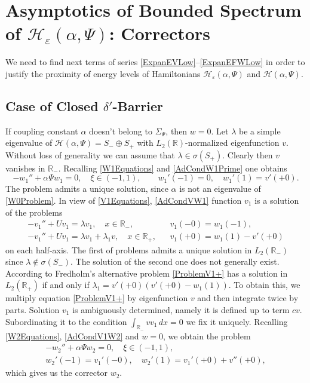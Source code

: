 \documentclass[11pt,english]{amsart}%
\begin{document}
\section{Asymptotics of Bounded Spectrum of  $\mathcal{H_{\varepsilon}}(\alpha,\Psi)$: Correctors}\label{SectionCorrector}
We need to find  next terms of  series \eqref{ExpanEVLow}--\eqref{ExpanEFWLow} in order to justify
the proximity of  energy levels of Hamiltonians $\mathcal{H_{\varepsilon}}(\alpha,\Psi)$ and $\mathcal{H}(\alpha,\Psi)$.



\subsection{Case of Closed $\delta'$-Barrier}
If coupling constant $\alpha$ doesn't belong to $\Sigma_\Psi$, then $w=0$.
Let $\lambda $ be a simple eigenvalue of  $\mathcal{H}(\alpha,\Psi)=S_-\oplus S_+$ with  $L_2(\mathbb{R})$-normalized eigenfunction $v$. Without loss of generality
we can assume that $\lambda\in \sigma(S_+)$. Clearly then $v$ vanishes in $\mathbb{R}_-$. Recalling \eqref{W1Equations} and \eqref{AdCondW1Prime} one obtains
\begin{equation*}
-w_1''+\alpha\Psi w_1=0,\quad\xi\in(-1,1),\qquad
w_1'(-1)=0,\quad w_1'(1)=v'(+0).
\end{equation*}
The problem admits a unique solution, since $\alpha$ is not an eigenvalue of \eqref{W0Problem}.
In view of \eqref{V1Equations}, \eqref{AdCondVW1}  function $v_1$
is a solution of the problems
\begin{align}\label{ProblemV1-}
  &-v_1''+U v_1=\lambda v_1, \quad x\in \mathbb{R}_-,&&v_1(-0)=w_1(-1),\\\label{ProblemV1+}
  &-v_1''+U v_1=\lambda v_1+\lambda_1 v, \quad x\in \mathbb{R}_+, &&v_1(+0)=w_1(1)-v '(+0)&
\end{align}
 on each half-axis.
The first of problems admits a unique solution in $L_2(\mathbb{R}_-)$ since  $\lambda\not\in \sigma(S_-)$.
The solution of the second one does not generally exist.
According to Fredholm's alternative problem \eqref{ProblemV1+} has a solution in $L_2(\mathbb{R}_+)$ if and only if
$\lambda_1=v '(+0)(v '(+0)-w_1(1))$. To obtain this, we  multiply  equation \eqref{ProblemV1+} by eigenfunction $v$ and then integrate twice by parts.
Solution $v_1$ is ambiguously determined, namely it is defined up to term $cv$. Subordinating it to the condition
$\int_{\mathbb{R}_-}v v_1\,dx=0$ we fix it uniquely.
 Recalling \eqref{W2Equations}, \eqref{AdCondV1W2} and $w=0$,  we obtain the problem
\begin{equation}\label{ProblemW2}
\begin{gathered}
    -w_2''+\alpha\Psi w_2=0 ,\quad \xi\in(-1,1),\\[5pt]
   w_2'(-1)=v_1'(-0),\quad w_2'(1)=v_1'(+0)+v ''(+0),
   \end{gathered}
\end{equation}
which gives us the corrector $w_2$.
\end{document}
